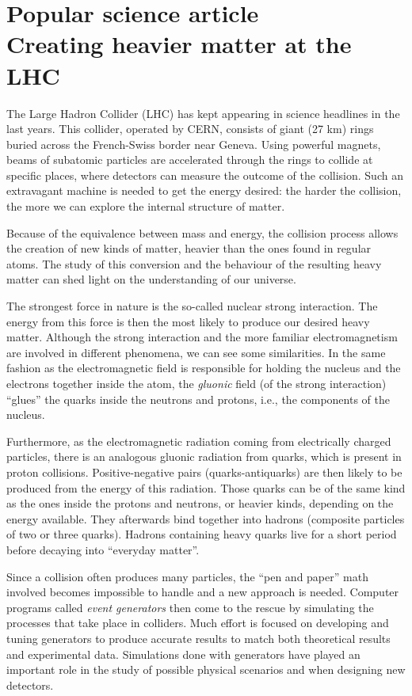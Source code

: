 \documentclass[a4paper,12pt]{article}
\begin{document}
\newpage

\section*{{\small Popular science article} \\ Creating heavier matter at the LHC}

The Large Hadron Collider (LHC) has kept appearing in science headlines in the last years. This collider, operated by CERN, consists of giant (27 km) rings buried across the French-Swiss border near Geneva. Using powerful magnets, beams of subatomic particles are accelerated through the rings to collide at specific places, where detectors can measure the outcome of the collision. Such an extravagant machine is needed to get the energy desired: the harder the collision, the more we can explore the internal structure of matter.

Because of the equivalence between mass and energy, the  collision process allows the creation of new kinds of matter, heavier than the ones found in regular atoms. The study of this conversion and the behaviour of the resulting heavy matter can shed light on the understanding of our universe.

The strongest force in nature is the so-called nuclear strong interaction. The energy from this force is then the most likely to produce our desired heavy matter. Although the strong interaction and the more familiar electromagnetism are involved in different phenomena, we can see some similarities. In the same fashion as the electromagnetic field is responsible for holding the nucleus and the electrons together inside the atom, the \textit{gluonic} field (of the strong interaction) ``glues'' the quarks inside the neutrons and protons, i.e., the components of the nucleus.

Furthermore, as the electromagnetic radiation coming from electrically charged particles, there is an analogous gluonic radiation from quarks, which is present in proton collisions. Positive-negative pairs (quarks-antiquarks) are then likely to be produced from the energy of this radiation. Those quarks can be of the same kind as the ones inside the protons and neutrons, or heavier kinds, depending on the energy available. They afterwards bind together into hadrons (composite particles of two or three quarks). Hadrons containing heavy quarks live for a short period before decaying into ``everyday matter''. 

Since a collision often produces many particles, the ``pen and paper'' math involved becomes impossible to handle and a new approach is needed. Computer programs called \textit{event generators} then come to the rescue by simulating the processes that take place in colliders. Much effort is focused on developing and tuning generators to produce accurate results to match both theoretical results and experimental data. Simulations done with generators have played an important role in the study of possible physical scenarios and when designing new detectors.
\end{document}

